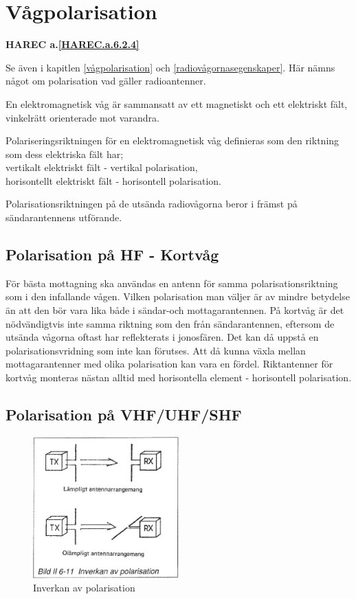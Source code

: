 \section{Vågpolarisation}
\textbf{
HAREC a.\ref{HAREC.a.6.2.4}\label{myHAREC.a.6.2.4}
}

Se även i kapitlen \ref{vågpolarisation} och \ref{radiovågornasegenskaper}.
Här nämns något om polarisation vad gäller radioantenner.

En elektromagnetisk våg är sammansatt av ett magnetiskt och ett
elektriskt fält, vinkelrätt orienterade mot varandra.

Polariseringsriktningen för en elektromagnetisk våg definieras som den riktning
som dess elektriska fält har; \\
vertikalt elektriskt fält - vertikal polarisation, \\
horisontellt elektriskt fält - horisontell polarisation.

Polarisationsriktningen på de utsända radiovågorna beror i främst på
sändarantennens utförande.

\subsection{Polarisation på HF - Kortvåg}
För bästa mottagning ska användas en antenn för samma
polarisationsriktning som i den infallande vågen. Vilken polarisation
man väljer är av mindre betydelse än att den bör vara lika både i
sändar-och mottagarantennen. På kortvåg är det nödvändigtvis inte
samma riktning som den från sändarantennen, eftersom de utsända
vågorna oftast har reflekterats i jonosfären. Det kan då uppstå en
polarisationsvridning som inte kan förutses. Att då kunna växla mellan
mottagarantenner med olika polarisation kan vara en
fördel. Riktantenner för kortvåg monteras nästan alltid med
horisontella element - horisontell polarisation.

\subsection{Polarisation på VHF/UHF/SHF}

\begin{figure}
  \includegraphics[width=0.5\textwidth]{images/bild_2_6-11}
  \caption{Inverkan av polarisation}
  \label{fig:bildII6-11}
\end{figure}

